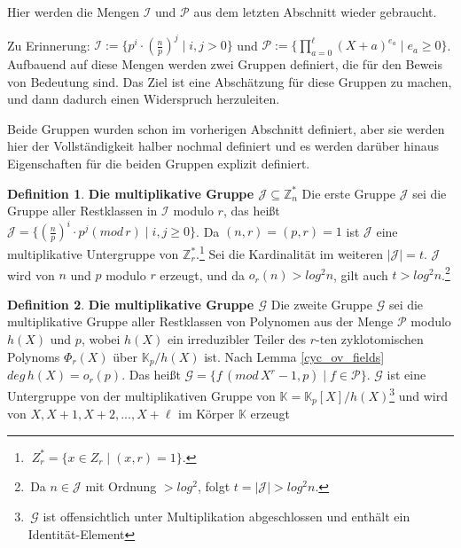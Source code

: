 \documentclass[12pt,oneside]{article}
\theoremstyle{remark}
\theoremstyle{definition}
\newtheorem{definition}{Definition}[section]
\begin{document}
Hier werden die Mengen $\mathcal{I}$ und $\mathcal{P}$ aus dem letzten Abschnitt wieder gebraucht.\newline

Zu Erinnerung: $\mathcal{I} := \{ p^{i} \cdot (\frac{n}{p})^j \mid i,j > 0 \}$ und $\mathcal{P} := \{ \prod_{a = 0}^{\ell} (X + a)^{e_{a}} \mid e_{a} \geq 0 \}$.
Aufbauend auf diese Mengen werden zwei Gruppen definiert, die für den Beweis von Bedeutung sind. Das Ziel ist eine Abschätzung für diese Gruppen zu machen, und dann dadurch einen Widerspruch herzuleiten.\newline\newline

Beide Gruppen wurden schon im vorherigen Abschnitt definiert, aber sie werden hier der Vollständigkeit halber nochmal definiert und es werden darüber hinaus Eigenschaften für die beiden Gruppen explizit definiert.


\begin{definition}\label{first_group}
\textbf{Die multiplikative Gruppe $\mathcal{J} \subseteq \mathbb{Z}_{n}^{*}$}\newline
Die erste Gruppe $\mathcal{J}$ sei die Gruppe aller Restklassen in $\mathcal{I}$ modulo $r$, das heißt $\mathcal{J} = \{(\frac{n}{p})^i \cdot p^j ( mod \, r) \mid i,j \geq 0 \}$. Da $(n,r) = (p,r) = 1 $ ist $\mathcal{J}$ eine multiplikative Untergruppe von $\mathbb{Z}_{r}^{*}$.\footnote{$\; {Z}_{r}^{*} = \{ x \in Z_{r} \mid (x,r) =1 \}$.} Sei die Kardinalität im weiteren $ | \mathcal{J} | = t $. $\mathcal{J}$ wird von $n$ und $p$ modulo $r$ erzeugt, und da $o_{r}(n) > log^2 n$, gilt auch $t > log^2 n$.\footnote{$ \,$Da $n \in \mathcal{J}$ mit Ordnung $> log^2 $, folgt $t = |\mathcal{J}| > log^2n$.}\newline
\end{definition}


\begin{definition}\label{second-group}
\textbf{Die multiplikative Gruppe $\mathcal{G}$}\newline
Die zweite Gruppe  $\mathcal{G}$ sei die multiplikative Gruppe aller Restklassen von Polynomen aus der Menge $\mathcal{P}$ modulo $h(X)$ und $p$, wobei $h(X)$ ein irreduzibler Teiler des $r$-ten zyklotomischen Polynoms $\Phi_{r}(X)$ über $\mathbb{K}_{p}/h(X)$ ist. Nach Lemma \ref{cyc_ov_fields} $deg \, h(X) = o_{r}(p)$. Das heißt $\mathcal{G} = \{ f \, (mod \, X^r - 1,p) \mid f \in \mathcal{P}\}$. $\mathcal{G}$ ist eine Untergruppe von der multiplikativen Gruppe von  $\mathbb{K} = \mathbb{K}_p[X] / h(X)$\footnote{$ \, \mathcal{G}$ ist offensichtlich unter Multiplikation abgeschlossen und enthält ein Identität-Element} und wird von $X,X+1,X+2, ..., X + \ell $ im Körper $\mathbb{K}$ erzeugt
\end{definition}
\end{document}
